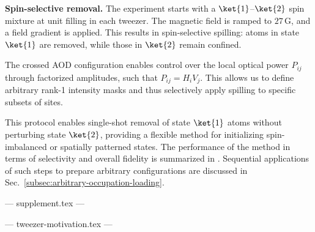 \textbf{Spin-selective removal.}
The experiment starts with a $\ket{1}$–$\ket{2}$ spin mixture at unit filling in each tweezer. The magnetic field is ramped to $27\,\mathrm{G}$, and a field gradient is applied. This results in spin-selective spilling: atoms in state $\ket{1}$ are removed, while those in $\ket{2}$ remain confined.

The crossed AOD configuration enables control over the local optical power $P_{ij}$ through factorized amplitudes, such that $P_{ij} = H_i V_j$. This allows us to define arbitrary rank-1 intensity masks and thus selectively apply spilling to specific subsets of sites. 

This protocol enables single-shot removal of state $\ket{1}$ atoms without perturbing state $\ket{2}$, providing a flexible method for initializing spin-imbalanced or spatially patterned states. The performance of the method in terms of selectivity and overall fidelity is summarized in . Sequential applications of such steps to prepare arbitrary configurations are discussed in Sec.~\ref{subsec:arbitrary-occupation-loading}.


--- supplement.tex ---



--- tweezer-motivation.tex ---

